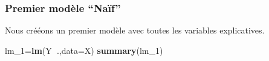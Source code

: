 \documentclass[french,]{article}
\newenvironment{Shaded}{\begin{snugshade}}{\end{snugshade}}
\newcommand{\DataTypeTok}[1]{\textcolor[rgb]{0.13,0.29,0.53}{#1}}
\newcommand{\DecValTok}[1]{\textcolor[rgb]{0.00,0.00,0.81}{#1}}
\newcommand{\KeywordTok}[1]{\textcolor[rgb]{0.13,0.29,0.53}{\textbf{#1}}}
\newcommand{\NormalTok}[1]{#1}
\newcommand{\OperatorTok}[1]{\textcolor[rgb]{0.81,0.36,0.00}{\textbf{#1}}}
\begin{document}
\hypertarget{premier-moduxe8le-nauxeff}{%
\subsubsection{Premier modèle
``Naïf''}\label{premier-moduxe8le-nauxeff}}

Nous crééons un premier modèle avec toutes les variables explicatives.

\begin{Shaded}
\begin{Highlighting}[]
\NormalTok{lm_}\DecValTok{1}\NormalTok{=}\KeywordTok{lm}\NormalTok{(Y}\OperatorTok{~}\NormalTok{.,}\DataTypeTok{data=}\NormalTok{X)  }
\KeywordTok{summary}\NormalTok{(lm_}\DecValTok{1}\NormalTok{)}
\end{Highlighting}
\end{Shaded}
\end{document}
